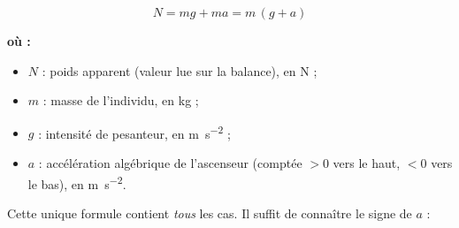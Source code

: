 \documentclass[11pt,a4paper]{article}
\newenvironment{ou}{%
  \par\smallskip\noindent\textbf{où :}\nopagebreak
  \begin{itemize}[leftmargin=1.8em,topsep=2pt,itemsep=1.5pt,parsep=0pt]}%
  {\end{itemize}}
\begin{document}
\begin{formule}
\[
\boxed{\;N=mg+ma=m\,(g+a)\;}
\]
\begin{ou}
  \item $N$ : poids apparent (valeur lue sur la balance), en \si{\newton} ;
  \item $m$ : masse de l'individu, en \si{\kilogram} ;
  \item $g$ : intensité de pesanteur, en \si{\metre\per\second\squared} ;
  \item $a$ : accélération algébrique de l'ascenseur (comptée $>0$ vers le haut,
        $<0$ vers le bas), en \si{\metre\per\second\squared}.
\end{ou}
\end{formule}

\noindent Cette unique formule contient \emph{tous} les cas. Il suffit de connaître le
signe de $a$ :
\end{document}
